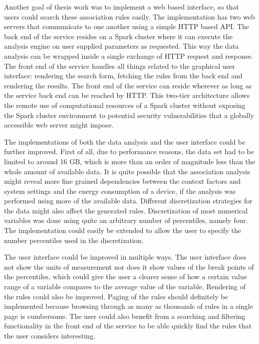Another goal of thesis work was to implement a web based interface, so that users could search these association rules easily. The implementation has two web servers that communicate to one another using a simple HTTP based API. The back end of the service resides on a Spark cluster where it can execute the analysis engine on user supplied parameters as requested. This way the data analysis can be wrapped inside a single exchange of HTTP request and response. The front end of the service handles all things related to the graphical user interface: rendering the search form, fetching the rules from the back end and rendering the results. The front end of the service can reside wherever as long as the service back end can be reached by HTTP. This two-tier architecture allows the remote use of computational resources of a Spark cluster without exposing the Spark cluster environment to potential security vulnerabilities that a globally accessible web server might impose.

The implementations of both the data analysis and the user interface could be further improved. First of all, due to performance reasons, the data set had to be limited to around 16 GB, which is more than an order of magnitude less than the whole amount of available data. It is quite possible that the association analysis might reveal more fine grained dependencies between the context factors and system settings and the energy consumption of a device, if the analysis was performed using more of the available data. Different discretization strategies for the data might also affect the generated rules. Discretization of most numerical variables was done using quite an arbitrary number of percentiles, namely four. The implementation could easily be extended to allow the user to specify the number percentiles used in the discretization.

The user interface could be improved in multiple ways. The user interface does not show the units of measurement nor does it show values of the break points of the percentiles, which could give the user a clearer sense of how a certain value range of a variable compares to the average value of the variable. Rendering of the rules could also be improved. Paging of the rules should definitely be implemented because browsing through as many as thousands of rules in a single page is cumbersome. The user could also benefit from a searching and filtering functionality in the front end of the service to be able quickly find the rules that the user considers interesting.
     